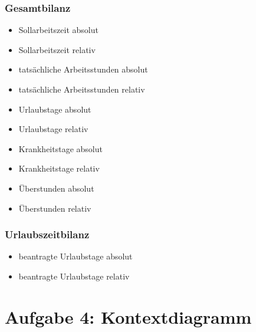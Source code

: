 \subsection{Gesamtbilanz}
\begin{itemize}[label=+]
\item[] Sollarbeitszeit absolut
\item Sollarbeitszeit relativ
\item tatsächliche Arbeitsstunden absolut
\item tatsächliche Arbeitsstunden relativ
\item Urlaubstage absolut
\item Urlaubstage relativ
\item Krankheitstage absolut
\item Krankheitstage relativ
\item Überstunden absolut
\item Überstunden relativ
\end{itemize}

\subsection{Urlaubszeitbilanz}
\begin{itemize}[label=+]
\item[] beantragte Urlaubstage absolut
\item beantragte Urlaubstage relativ
\end{itemize}

\chapter*{Aufgabe 4: Kontextdiagramm}
\setcounter{section}{0}
\addtocounter{chapter}{1}



